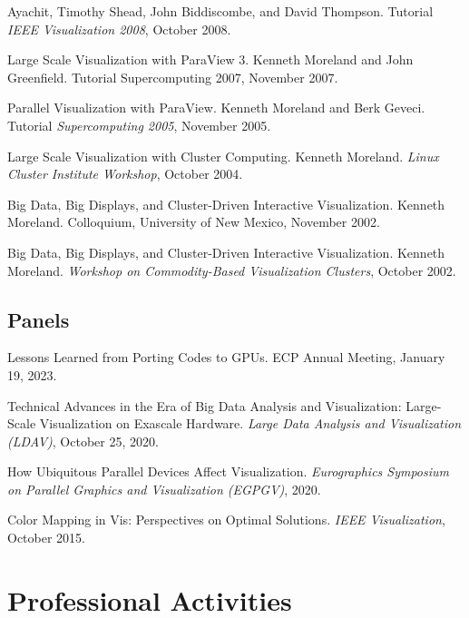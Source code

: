 \documentclass{article}
\begin{document}
\begin{enumerate}[label={[\arabic*]}]
  Ayachit, Timothy Shead, John Biddiscombe, and David
  Thompson. Tutorial \emph{IEEE Visualization 2008}, October 2008.
\item Large Scale Visualization with ParaView 3. Kenneth Moreland and
  John Greenfield. Tutorial Supercomputing 2007, November 2007.
\item Parallel Visualization with ParaView. Kenneth Moreland and Berk
  Geveci. Tutorial \emph{Supercomputing 2005}, November 2005.
\item Large Scale Visualization with Cluster Computing. Kenneth
  Moreland. \emph{Linux Cluster Institute Workshop}, October 2004.
\item Big Data, Big Displays, and Cluster-Driven Interactive
  Visualization. Kenneth Moreland. Colloquium, University of New
  Mexico, November 2002.
\item Big Data, Big Displays, and Cluster-Driven Interactive
  Visualization. Kenneth Moreland. \emph{Workshop on Commodity-Based
  Visualization Clusters}, October 2002.
\end{enumerate}


\subsection*{Panels}

\begin{enumerate}[label={[\arabic*]}]
\item Lessons Learned from Porting Codes to GPUs.
  ECP Annual Meeting, January 19, 2023.
\item Technical Advances in the Era of Big Data Analysis and Visualization: Large-Scale Visualization on Exascale Hardware.
  \emph{Large Data Analysis and Visualization (LDAV)}, October 25, 2020.
\item How Ubiquitous Parallel Devices Affect Visualization.
  \emph{Eurographics Symposium on Parallel Graphics and Visualization (EGPGV)}, 2020.
\item Color Mapping in Vis: Perspectives on Optimal Solutions.
  \emph{IEEE Visualization}, October 2015.
\end{enumerate}


\section*{Professional Activities}
\end{document}
